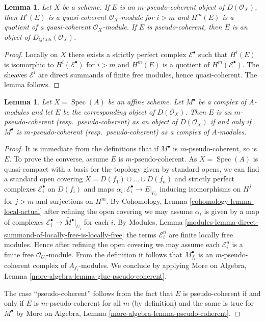 \documentclass{stacks-project}
\theoremstyle{plain}
\newtheorem{lemma}[subsection]{Lemma}
\theoremstyle{definition}
\theoremstyle{remark}
\numberwithin{equation}{subsection}
\def\Spec{\mathop{\mathrm{Spec}}}
\def\QCoh{\mathit{QCoh}}
\begin{document}
\begin{lemma}
\label{lemma-pseudo-coherent}
Let $X$ be a scheme. If $E$ is an $m$-pseudo-coherent
object of $D(\mathcal{O}_X)$, then $H^i(E)$ is a quasi-coherent
$\mathcal{O}_X$-module for $i > m$ and $H^m(E)$ is a quotient
of a quasi-coherent $\mathcal{O}_X$-module.
If $E$ is pseudo-coherent, then $E$ is an object of
$D_\QCoh(\mathcal{O}_X)$.
\end{lemma}

\begin{proof}
Locally on $X$ there exists a strictly perfect complex $\mathcal{E}^\bullet$
such that $H^i(E)$ is isomorphic to $H^i(\mathcal{E}^\bullet)$ for $i > m$
and $H^m(E)$ is a quotient of $H^m(\mathcal{E}^\bullet)$. The sheaves
$\mathcal{E}^i$ are direct summands of finite free modules,
hence quasi-coherent. The lemma follows.
\end{proof}

\begin{lemma}
\label{lemma-pseudo-coherent-affine}
Let $X = \Spec(A)$ be an affine scheme. Let $M^\bullet$ be a
complex of $A$-modules and let $E$ be the corresponding object
of $D(\mathcal{O}_X)$. Then $E$ is an $m$-pseudo-coherent
(resp.\ pseudo-coherent) as an object of $D(\mathcal{O}_X)$
if and only if $M^\bullet$ is $m$-pseudo-coherent (resp.\ pseudo-coherent)
as a complex of $A$-modules.
\end{lemma}

\begin{proof}
It is immediate from the definitions that if $M^\bullet$ is
$m$-pseudo-coherent, so is $E$. To prove the converse, assume
$E$ is $m$-pseudo-coherent. As $X = \Spec(A)$ is quasi-compact with
a basis for the topology given by standard opens, we can find a standard
open covering $X = D(f_1) \cup \ldots \cup D(f_n)$ and strictly
perfect complexes $\mathcal{E}_i^\bullet$ on $D(f_i)$ and
maps $\alpha_i : \mathcal{E}_i^\bullet \to E|_{U_i}$ inducing
isomorphisms on $H^j$ for $j > m$ and surjections on $H^m$.
By Cohomology, Lemma \ref{cohomology-lemma-local-actual}
after refining the open covering
we may assume $\alpha_i$ is given by a map of complexes
$\mathcal{E}_i^\bullet \to \widetilde{M^\bullet}|_{U_i}$
for each $i$. By Modules, Lemma
\ref{modules-lemma-direct-summand-of-locally-free-is-locally-free}
the terms $\mathcal{E}_i^n$ are finite locally free modules.
Hence after refining the open covering we may assume each
$\mathcal{E}_i^n$ is a finite free $\mathcal{O}_{U_i}$-module.
From the definition it follows that $M^\bullet_{f_i}$ is
an $m$-pseudo-coherent complex of $A_{f_i}$-modules.
We conclude by applying
More on Algebra, Lemma \ref{more-algebra-lemma-glue-pseudo-coherent}.

\medskip\noindent
The case ``pseudo-coherent'' follows from the fact that $E$ is
pseudo-coherent if and only if $E$ is $m$-pseudo-coherent for
all $m$ (by definition) and the same is true for $M^\bullet$
by More on Algebra, Lemma \ref{more-algebra-lemma-pseudo-coherent}.
\end{proof}
\end{document}
